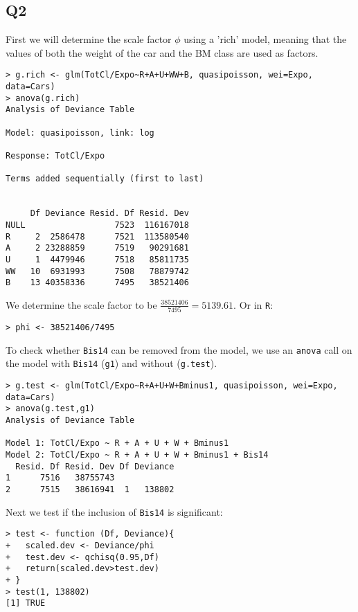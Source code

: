 \documentclass[11pt]{article}
\begin{document}
\subsection*{Q2}

First we will determine the scale factor $\phi$ using a 'rich' model, meaning that the values of both the weight of the car and the BM class are used as factors.

\begin{verbatim}
> g.rich <- glm(TotCl/Expo~R+A+U+WW+B, quasipoisson, wei=Expo, data=Cars)
> anova(g.rich)
Analysis of Deviance Table

Model: quasipoisson, link: log

Response: TotCl/Expo

Terms added sequentially (first to last)


     Df Deviance Resid. Df Resid. Dev
NULL                  7523  116167018
R     2  2586478      7521  113580540
A     2 23288859      7519   90291681
U     1  4479946      7518   85811735
WW   10  6931993      7508   78879742
B    13 40358336      7495   38521406
\end{verbatim}

We determine the scale factor to be $\frac{38521406}{7495} = 5139.61$. Or in \verb|R|:

\begin{verbatim}
> phi <- 38521406/7495
\end{verbatim}

To check whether \verb|Bis14| can be removed from the model, we use an \verb|anova| call on the model with \verb|Bis14| (\verb|g1|) and without (\verb|g.test|).

\begin{verbatim}
> g.test <- glm(TotCl/Expo~R+A+U+W+Bminus1, quasipoisson, wei=Expo, data=Cars)
> anova(g.test,g1)
Analysis of Deviance Table

Model 1: TotCl/Expo ~ R + A + U + W + Bminus1
Model 2: TotCl/Expo ~ R + A + U + W + Bminus1 + Bis14
  Resid. Df Resid. Dev Df Deviance
1      7516   38755743            
2      7515   38616941  1   138802
\end{verbatim} 

Next we test if the inclusion of \verb|Bis14| is significant:

\begin{verbatim}
> test <- function (Df, Deviance){
+   scaled.dev <- Deviance/phi
+   test.dev <- qchisq(0.95,Df)
+   return(scaled.dev>test.dev)
+ }
> test(1, 138802)
[1] TRUE
\end{verbatim}
\end{document}
